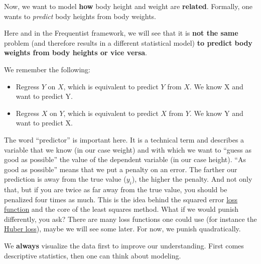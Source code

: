 \documentclass[
]{book}
\newenvironment{Shaded}{\begin{snugshade}}{\end{snugshade}}
\newcommand{\DecValTok}[1]{\textcolor[rgb]{0.00,0.00,0.81}{#1}}
\newcommand{\FunctionTok}[1]{\textcolor[rgb]{0.13,0.29,0.53}{\textbf{#1}}}
\newcommand{\NormalTok}[1]{#1}
\newcommand{\OtherTok}[1]{\textcolor[rgb]{0.56,0.35,0.01}{#1}}
\newcommand{\SpecialCharTok}[1]{\textcolor[rgb]{0.81,0.36,0.00}{\textbf{#1}}}
\providecommand{\tightlist}{%
  \setlength{\itemsep}{0pt}\setlength{\parskip}{0pt}}
\begin{document}
Now, we want to model \textbf{how} body height and weight are \textbf{related}.
Formally, one wants to \emph{predict} body heights from body weights.

Here and in the Frequentist framework, we will see that it is \textbf{not the same}
problem (and therefore results in a different statistical model)
\textbf{to predict body weights from body heights or vice versa}.

We remember the following:

\begin{itemize}
\tightlist
\item
  Regress \(Y\) on \(X\), which is equivalent to predict \(Y\) from \(X\).
  We know X and want to predict Y.
\item
  Regress \(X\) on \(Y\), which is equivalent to predict \(X\) from \(Y\).
  We know Y and want to predict X.
\end{itemize}

The word ``predictor'' is important here. It is a technical term
and describes a variable that we know (in our case weight) and with
which we want to ``guess as good as possible'' the value of the
dependent variable (in our case height). ``As good as possible''
means that we put a penalty on an error. The farther our prediction
is away from the true value (\(y_i\)), the higher the penalty.
And not only that, but if you are twice as far away from the true value,
you should be penalized four times as much. This is the idea behind
the squared error \href{https://en.wikipedia.org/wiki/Loss_function}{loss function}
and the core of the least squares method.
What if we would punish differently, you ask?
There are many loss functions one could use
(for instance the \href{https://en.wikipedia.org/wiki/Huber_loss}{Huber loss}),
maybe we will see some later. For now, we punish quadratically.

We \textbf{always} visualize the data first to improve our understanding.
First comes descriptive statistics, then one can think about modeling.

\begin{Shaded}
\end{Shaded}
\end{document}
